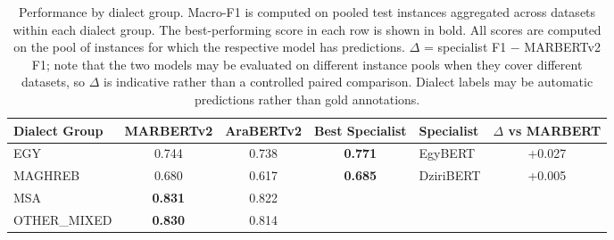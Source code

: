 \begin{table}[t]
\centering
\caption{Performance by dialect group. Macro-F1 is computed on pooled test instances aggregated across datasets within each dialect group. The best-performing score in each row is shown in bold. All scores are computed on the pool of instances for which the respective model has predictions. $\Delta$ = specialist F1 $-$ MARBERTv2 F1; note that the two models may be evaluated on different instance pools when they cover different datasets, so $\Delta$ is indicative rather than a controlled paired comparison. Dialect labels may be automatic predictions rather than gold annotations.}
\label{tab:dialect_group_results}
\begin{tabular}{l c c c l c}
\toprule
Dialect Group & MARBERTv2 & AraBERTv2 & Best Specialist & Specialist & $\Delta$ vs MARBERT \\
\midrule
EGY & 0.744 & 0.738 & \textbf{0.771} & EgyBERT & +0.027 \\
MAGHREB & 0.680 & 0.617 & \textbf{0.685} & DziriBERT & +0.005 \\
MSA & \textbf{0.831} & 0.822 & \textemdash{} & \textemdash{} & \textemdash{} \\
OTHER_MIXED & \textbf{0.830} & 0.814 & \textemdash{} & \textemdash{} & \textemdash{} \\
\bottomrule
\end{tabular}
\end{table}
